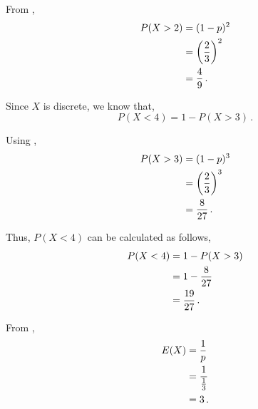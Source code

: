 \begin{subquestions}
\begin{subsubquestions}
\begin{subsubsubquestions}

\subsubsubquestion

From ,
\begin{align}
	P(X > 2) & = (1-p)^2 \nonumber \\
	            & = \left(\frac{2}{3}\right)^2 \nonumber \\
	            & = \frac{4}{9} \,.
\end{align}


\subsubsubquestion

Since $X$ is discrete, we know that,
\begin{equation}
	P(X < 4) = 1 - P(X > 3) \,.
\end{equation}

Using ,
\begin{align}
	P(X > 3) & = (1-p)^3 \nonumber \\
		   	 & = \left(\frac{2}{3}\right)^3 \nonumber \\
			 & = \frac{8}{27} \,.
\end{align}

Thus, $P(X<4)$ can be calculated as follows,
\begin{align}
	P(X < 4) & = 1 - P(X > 3) \nonumber \\
	         & = 1 - \frac{8}{27} \nonumber \\
	         & = \frac{19}{27} \,.
\end{align}

\end{subsubsubquestions}


\subsubquestion

From ,
\begin{align}
	E(X) & = \frac{1}{p} \nonumber \\
	     & = \frac{1}{\frac{1}{3}} \nonumber \\
	     & = 3 \,.
\end{align}


\end{subsubquestions}

\end{subquestions}
